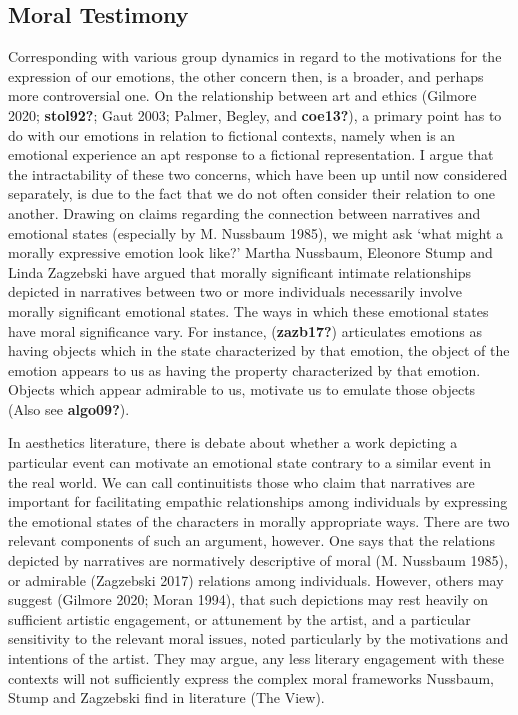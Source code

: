 \documentclass[12pt]{book}
\theoremstyle{definition}
\theoremstyle{remark}
\begin{document}
\subsection*{Moral Testimony}\label{moral-testimony}

Corresponding with various group dynamics in regard to the motivations for the expression of our emotions, the other concern then, is a broader, and perhaps more controversial one. On the relationship between art and ethics (Gilmore 2020; \textbf{stol92?}; Gaut 2003; Palmer, Begley, and \textbf{coe13?}), a primary point has to do with our emotions in relation to fictional contexts, namely when is an emotional experience an apt response to a fictional representation. I argue that the intractability of these two concerns, which have been up until now considered separately, is due to the fact that we do not often consider their relation to one another. Drawing on claims regarding the connection between narratives and emotional states (especially by M. Nussbaum 1985), we might ask `what might a morally expressive emotion look like?' Martha Nussbaum, Eleonore Stump and Linda Zagzebski have argued that morally significant intimate relationships depicted in narratives between two or more individuals necessarily involve morally significant emotional states. The ways in which these emotional states have moral significance vary. For instance, (\textbf{zazb17?}) articulates emotions as having objects which in the state characterized by that emotion, the object of the emotion appears to us as having the property characterized by that emotion. Objects which appear admirable to us, motivate us to emulate those objects (Also see \textbf{algo09?}).

In aesthetics literature, there is debate about whether a work depicting a particular event can motivate an emotional state contrary to a similar event in the real world. We can call continuitists those who claim that narratives are important for facilitating empathic relationships among individuals by expressing the emotional states of the characters in morally appropriate ways. There are two relevant components of such an argument, however. One says that the relations depicted by narratives are normatively descriptive of moral (M. Nussbaum 1985), or admirable (Zagzebski 2017) relations among individuals. However, others may suggest (Gilmore 2020; Moran 1994), that such depictions may rest heavily on sufficient artistic engagement, or attunement by the artist, and a particular sensitivity to the relevant moral issues, noted particularly by the motivations and intentions of the artist. They may argue, any less literary engagement with these contexts will not sufficiently express the complex moral frameworks Nussbaum, Stump and Zagzebski find in literature (The View).
\end{document}

